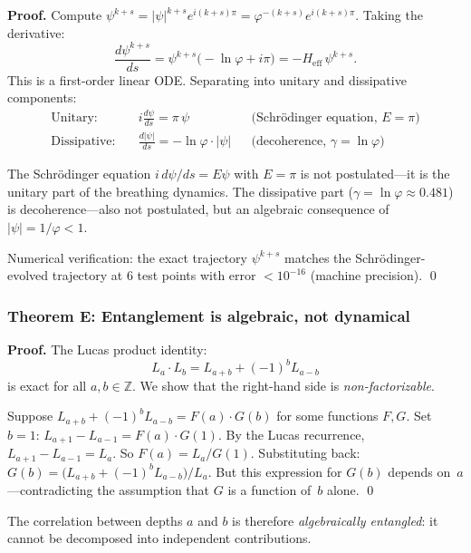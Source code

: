 \documentclass[12pt,a4paper]{article}
\begin{document}
\textbf{Proof.} Compute $\psi^{k+s} = |\psi|^{k+s} e^{i(k+s)\pi} = \varphi^{-(k+s)} e^{i(k+s)\pi}$. Taking the derivative:
\begin{equation}
\frac{d\psi^{k+s}}{ds} = \psi^{k+s} \bigl(-\ln\varphi + i\pi\bigr) = -H_{\mathrm{eff}} \, \psi^{k+s}.
\end{equation}
This is a first-order linear ODE. Separating into unitary and dissipative components:
\begin{align}
\text{Unitary:} & \quad i\frac{d\psi}{ds} = \pi \, \psi & & \text{(Schr\"odinger equation, $E = \pi$)} \\
\text{Dissipative:} & \quad \frac{d|\psi|}{ds} = -\ln\varphi \cdot |\psi| & & \text{(decoherence, $\gamma = \ln\varphi$)}
\end{align}

The Schr\"odinger equation $i \, d\psi/ds = E\psi$ with $E = \pi$ is not postulated---it is the unitary part of the breathing dynamics. The dissipative part ($\gamma = \ln\varphi \approx 0.481$) is decoherence---also not postulated, but an algebraic consequence of $|\psi| = 1/\varphi < 1$.

Numerical verification: the exact trajectory $\psi^{k+s}$ matches the Schr\"odinger-evolved trajectory at 6 test points with error $< 10^{-16}$ (machine precision). \qed

\subsubsection{Theorem E: Entanglement is algebraic, not dynamical}

\textbf{Proof.} The Lucas product identity:
\begin{equation}
L_a \cdot L_b = L_{a+b} + (-1)^b L_{a-b}
\end{equation}
is exact for all $a, b \in \mathbb{Z}$. We show that the right-hand side is \emph{non-factorizable}.

Suppose $L_{a+b} + (-1)^b L_{a-b} = F(a) \cdot G(b)$ for some functions $F, G$. Set $b = 1$: $L_{a+1} - L_{a-1} = F(a) \cdot G(1)$. By the Lucas recurrence, $L_{a+1} - L_{a-1} = L_a$. So $F(a) = L_a / G(1)$. Substituting back: $G(b) = \bigl(L_{a+b} + (-1)^b L_{a-b}\bigr)/L_a$. But this expression for $G(b)$ depends on~$a$---contradicting the assumption that $G$ is a function of~$b$ alone. \qed

The correlation between depths $a$ and $b$ is therefore \emph{algebraically entangled}: it cannot be decomposed into independent contributions.
\end{document}
